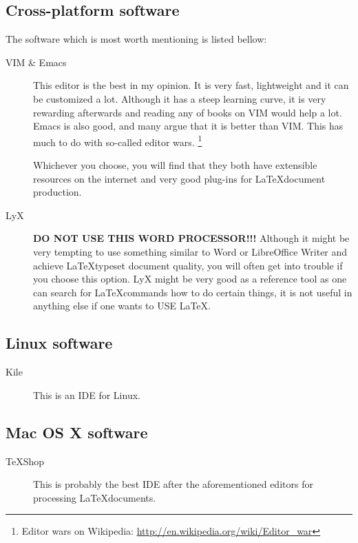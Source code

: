 \documentclass[a4paper]{article}
\begin{document}
\subsection{Cross-platform software}

The software which is most worth mentioning is listed bellow:
\begin{description}
    \item[VIM \& Emacs] This editor is the best in my opinion. It is very fast,
        lightweight and it can be customized a lot. Although it has a steep
        learning curve, it is very rewarding afterwards and reading any of books
        on VIM would help a lot. Emacs is also good, and many argue that it is
        better than VIM. This has much to do with so-called editor wars.
        \footnote{Editor wars on Wikipedia:
        \url{http://en.wikipedia.org/wiki/Editor_war}}

        Whichever you choose, you will find that they both have extensible
        resources on the internet and very good plug-ins for \LaTeX document
        production.
    \item[LyX] {\bfseries DO NOT USE THIS WORD PROCESSOR!!!} Although it might
        be very tempting to use something similar to Word or LibreOffice Writer
        and achieve \LaTeX typeset document quality, you will often get into
        trouble if you choose this option. LyX might be very good as a reference
        tool as one can search for \LaTeX commands how to do certain things, it
        is not useful in anything else if one wants to USE \LaTeX .
\end{description}

\subsection{Linux software}

\begin{description}
    \item[Kile] This is an IDE for Linux.
\end{description}

\subsection{Mac OS X software}

\begin{description}
    \item[TeXShop] This is probably the best IDE after the aforementioned
        editors for processing \LaTeX documents.
\end{description}
\end{document}
